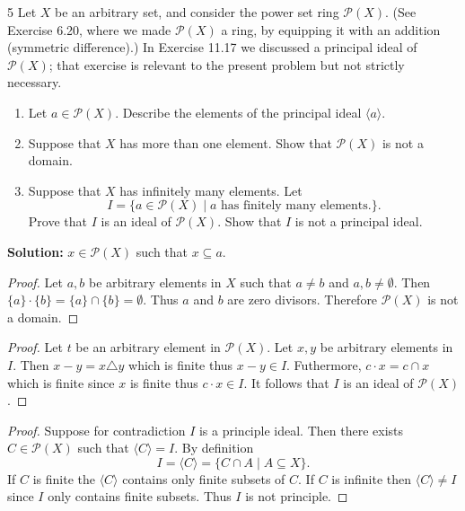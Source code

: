 \begin{problem}{5}
    Let $X$ be an arbitrary set, and consider the power set ring $\mathcal{P}(X)$.
    (See Exercise 6.20, where we made $\mathcal{P}(X)$ a ring, by equipping it with an addition (symmetric difference).)
    In Exercise 11.17 we discussed a principal ideal of $\mathcal{P}(X)$; that exercise is relevant to the present 
    problem but not strictly necessary.
    \begin{enumerate}
        \item Let $a \in \mathcal{P}(X)$. Describe the elements of the principal ideal $\langle a \rangle$.
        \item Suppose that $X$ has more than one element. Show that $\mathcal{P}(X)$ is not a domain.
        \item Suppose that $X$ has infinitely many elements. Let 
        \[I = \{a \in \mathcal{P}(X) \mid a \text{ has finitely many elements}.\}.\]
        Prove that $I$ is an ideal of $\mathcal{P}(X)$. 
        Show that $I$ is not a principal ideal.
    \end{enumerate}
\end{problem}
\solved

\textbf{Solution: } $x \in \mathcal{P}(X)$ such that $x \subseteq a$.

\begin{proof}
    Let $a, b$ be arbitrary elements in $X$ such that $a \ne b$ and $a, b \ne \emptyset$.
    Then $\{a\} \cdot \{b\} = \{a\} \cap \{b\} = \emptyset$.
    Thus $a$ and $b$ are zero divisors.
    Therefore $\mathcal{P}(X)$ is not a domain.
\end{proof}

\begin{proof}
    Let $t$ be an arbitrary element in $\mathcal{P}(X)$.
    Let $x, y$ be arbitrary elements in $I$.
    Then $x - y = x \triangle y$ which is finite thus $x - y \in I$.
    Futhermore, $c \cdot x = c \cap x$ which is finite since $x$ is finite thus $c \cdot x \in I$.
    It follows that $I$ is an ideal of $\mathcal{P}(X)$.
\end{proof}

\begin{proof}
    Suppose for contradiction $I$ is a principle ideal.
    Then there exists $C \in \mathcal{P}(X)$ such that $\langle C \rangle = I$.
    By definition 
    \[I = \langle C \rangle = \{C \cap A \mid A \subseteq X\}.\]
    If $C$ is finite the $\langle C \rangle$ contains only finite subsets of $C$.
    If $C$ is infinite then $\langle C \rangle \ne I$ since $I$ only contains finite subsets.
    Thus $I$ is not principle.
\end{proof}

